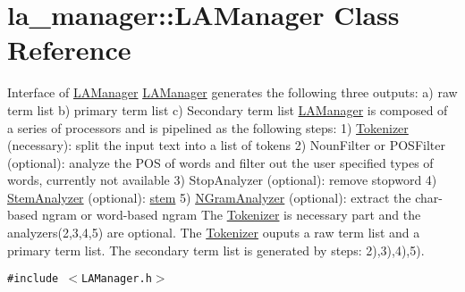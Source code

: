 \hypertarget{classla__manager_1_1LAManager}{
\section{la\_\-manager::LAManager Class Reference}
\label{classla__manager_1_1LAManager}
}
Interface of \hyperlink{classla__manager_1_1LAManager}{LAManager} \hyperlink{classla__manager_1_1LAManager}{LAManager} generates the following three outputs: a) raw term list b) primary term list c) Secondary term list \hyperlink{classla__manager_1_1LAManager}{LAManager} is composed of a series of processors and is pipelined as the following steps: 1) \hyperlink{classla__manager_1_1Tokenizer}{Tokenizer} (necessary): split the input text into a list of tokens 2) NounFilter or POSFilter (optional): analyze the POS of words and filter out the user specified types of words, currently not available 3) StopAnalyzer (optional): remove stopword 4) \hyperlink{classla__manager_1_1StemAnalyzer}{StemAnalyzer} (optional): \hyperlink{namespacela__manager_1_1stem}{stem} 5) \hyperlink{classla__manager_1_1NGramAnalyzer}{NGramAnalyzer} (optional): extract the char-based ngram or word-based ngram The \hyperlink{classla__manager_1_1Tokenizer}{Tokenizer} is necessary part and the analyzers(2,3,4,5) are optional. The \hyperlink{classla__manager_1_1Tokenizer}{Tokenizer} ouputs a raw term list and a primary term list. The secondary term list is generated by steps: 2),3),4),5).  


{\tt \#include $<$LAManager.h$>$}

